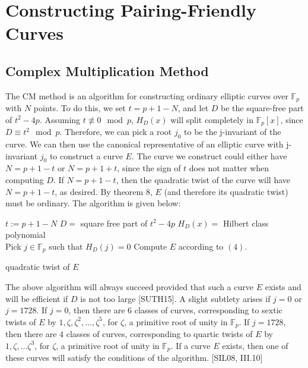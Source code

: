 \documentclass[12pt,twoside]{article}
\begin{document}
\section{Constructing Pairing-Friendly Curves} 

\subsection{Complex Multiplication Method} 

The CM method is an algorithm for constructing ordinary elliptic curves over $\mathbb F_p$ with $N$ points. To do this, we set $t = p+1 - N$, and let $D$ be the square-free part of $t^2-4p$. Assuming $t \not \equiv 0 \mod p$, $H_{D}(x)$ will split completely in $\mathbb F_p[x]$, since $D \equiv t^2 \mod p$. Therefore, we can pick a root $j_0$ to be the j-invariant of the curve. We can then use the canonical representative of an elliptic curve with j-invariant $j_0$ to construct a curve $E$. The curve we construct could either have $N = p+1 - t$ or $N= p+1 + t$, since the sign of $t$ does not matter when computing $D$. If $N = p+1 -t$, then the quadratic twist of the curve will have $N = p+1 -t$, as desired. By theorem 8, $E$ (and therefore its quadratic twist) must be ordinary. The algorithm is given below:

\begin{algorithm}[H]
 $t := p+1 - N$\; 
 $D = $ square free part of $t^2-4p$\;
 $H_D(x) = $ Hilbert class polynomial \\
 Pick $j \in \mathbb F_p$ such that $H_D(j) = 0$
 Compute $E$ according to $(4)$.
 
  {
 }
 {\Return quadratic twist of $E$}
 \end{algorithm}
 \bigskip
 

 
 
 
 
 
 
\noindent 

 The above algorithm will always succeed provided that such a curve $E$ exists and will be efficient if $D$ is not too large [SUTH15]. A slight subtlety arises if $j = 0$ or $j = 1728$. If $j = 0$, then there are $6$ classes of curves, corresponding to sextic twists of $E$ by $1, \zeta, \zeta^2, \dots, \zeta^5$, for $\zeta$, a primitive root of unity in $\mathbb F_p$. If $j = 1728$, then there are $4$ classes of curves, corresponding to quartic twists of $E$ by $1, \zeta, \dots \zeta^3$, for $\zeta$, a primitive root of unity in $\mathbb F_p$. If a curve $E$ exists, then one of these curves will satisfy the conditions of the algorithm. [SIL08, III.10]
\end{document}
